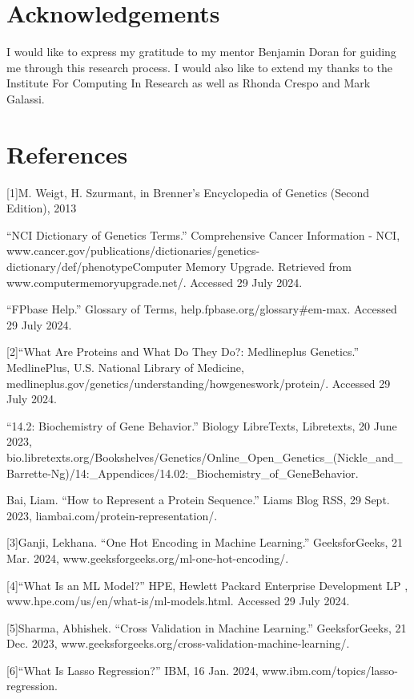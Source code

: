 \documentclass{article}
\begin{document}
\section{Acknowledgements}

I would like to express my gratitude to my mentor Benjamin Doran for guiding me through this research process. I would also like to extend my thanks to the Institute For Computing In Research as well as Rhonda Crespo and Mark Galassi.\par

\section{References}
\indent

\leftskip 0.3in
\parindent -0.3in
[1]M. Weigt, H. Szurmant, in Brenner's Encyclopedia of Genetics (Second Edition), 2013

“NCI Dictionary of Genetics Terms.” Comprehensive Cancer Information - NCI, www.cancer.gov/publications/dictionaries/genetics-dictionary/def/phenotypeComputer Memory Upgrade. Retrieved from www.computermemoryupgrade.net/. Accessed 29 July 2024. 

“FPbase Help.” Glossary of Terms, help.fpbase.org/glossary\#em-max. Accessed 29 July 2024. 

[2]“What Are Proteins and What Do They Do?: Medlineplus Genetics.” MedlinePlus, U.S. National Library of Medicine, medlineplus.gov/genetics/understanding/howgeneswork/protein/. Accessed 29 July 2024. 

“14.2: Biochemistry of Gene Behavior.” Biology LibreTexts, Libretexts, 20 June 2023, bio.libretexts.org/Bookshelves/Genetics/Online\_Open\_Genetics\_(Nickle\_and\_Barrette-Ng)/14:\_Appendices/14.02:\_Biochemistry\_of\_GeneBehavior. 

Bai, Liam. “How to Represent a Protein Sequence.” Liams Blog RSS, 29 Sept. 2023, liambai.com/protein-representation/. 

[3]Ganji, Lekhana. “One Hot Encoding in Machine Learning.” GeeksforGeeks, 21 Mar. 2024, www.geeksforgeeks.org/ml-one-hot-encoding/. 

[4]“What Is an ML Model?” HPE, Hewlett Packard Enterprise Development LP , www.hpe.com/us/en/what-is/ml-models.html. Accessed 29 July 2024. 

[5]Sharma, Abhishek. “Cross Validation in Machine Learning.” GeeksforGeeks, 21 Dec. 2023, www.geeksforgeeks.org/cross-validation-machine-learning/. 

[6]“What Is Lasso Regression?” IBM, 16 Jan. 2024, www.ibm.com/topics/lasso-regression. 
\end{document}
